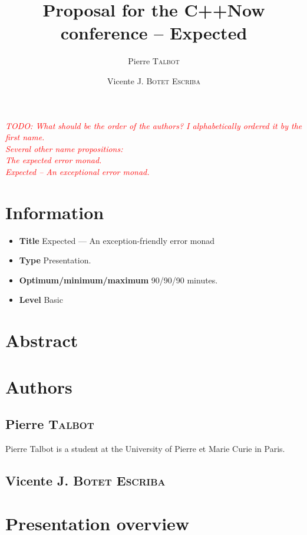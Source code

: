\documentclass[a4paper,10pt]{article}
\title{Proposal for the C++Now conference – Expected}
\author{Pierre T\textsc{albot} \and Vicente J. B\textsc{otet} E\textsc{scriba}}
\newcommand{\todo}[1]{\emph{\textcolor{red}{TODO: #1}}}
\begin{document}
\maketitle
\todo{What should be the order of the authors? I alphabetically ordered it by the first name.\\
Several other name propositions:\\
The expected error monad.\\
Expected – An exceptional error monad.\\}
\section{Information}

\begin{itemize}
\item \textbf{Title} Expected — An exception-friendly error monad
\item \textbf{Type} Presentation.
\item \textbf{Optimum/minimum/maximum} 90/90/90 minutes.
\item \textbf{Level} Basic
\end{itemize}

\section{Abstract}



\section{Authors}

\subsection{Pierre T\textsc{albot}}

Pierre Talbot is a student at the University of Pierre et Marie Curie in Paris.

\subsection{Vicente J. B\textsc{otet} E\textsc{scriba}}

\section{Presentation overview}
\end{document}
